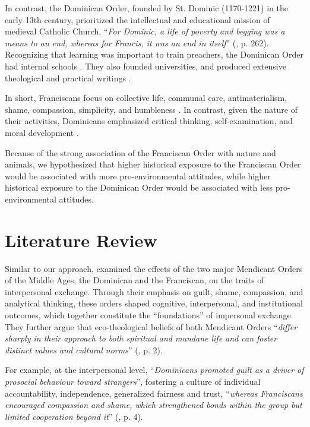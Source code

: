 \documentclass[12pt, a4paper]{article}
\begin{document}
In contrast, the Dominican Order, founded by St. Dominic
(1170-1221) in the early 13th century, prioritized the intellectual
and educational mission of medieval Catholic Church. ``\textit{For Dominic, a life of poverty and begging was a means to an end, whereas for Francis, it was an end in itself}'' (\cite{lynch2014}, p. 262). Recognizing that learning was important to train preachers, the Dominican Order had internal schools \parencite{lynch2014}. They also founded universities, and produced extensive theological and
practical writings \parencite{legoff1980,boyle1981}.

In short, Franciscans focus on collective life, communal care, antimaterialism, shame, compassion, simplicity, and humbleness \parencite{arrunada2024}. In contrast, given the nature of their activities, Dominicans emphasized critical thinking, self-examination, and moral development \parencite{hinnebusch1966,lesnick1989}.

Because of the strong association of the Franciscan Order with nature and animals, we hypothesized that higher historical exposure to the Franciscan Order would be associated with more pro-environmental attitudes, while higher historical exposure to the Dominican Order would be associated with less pro-environmental attitudes.

\section{Literature Review}

Similar to our approach, \textcite{arrunada2024} examined the effects of the two major Mendicant Orders of the  Middle Ages, the Dominican and the Franciscan, on the traits of interpersonal exchange. Through their emphasis on guilt, shame, compassion, and analytical thinking, these orders shaped cognitive, interpersonal, and institutional outcomes, which together constitute the ``foundations” of impersonal exchange. They further argue that eco-theological beliefs of both Mendicant Orders ``\textit{differ sharply in their approach to both spiritual and mundane life and can foster distinct values and cultural norms}'' (\cite{arrunada2024}, p. 2). 

For example, at the interpersonal level, ``\textit{Dominicans promoted guilt as a driver of prosocial behaviour toward strangers}'', fostering a culture of individual accountability, independence, generalized fairness and trust, ``\textit{whereas Franciscans encouraged compassion and shame, which strengthened bonds within the group but limited cooperation beyond it}'' (\cite{arrunada2024}, p. 4). 
\end{document}
